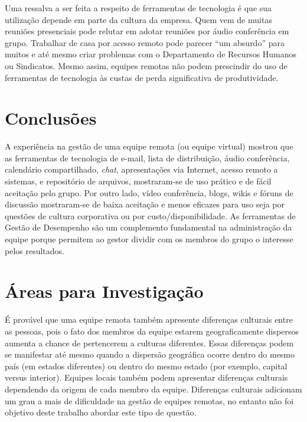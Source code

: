 \documentclass[12pt]{article} %
\begin{document}
Uma ressalva a ser feita a respeito de ferramentas de tecnologia é que sua utilização
depende em parte da cultura da empresa. Quem vem de muitas reuniões 
presenciais pode relutar em adotar reuniões por áudio conferência em grupo.  Trabalhar de casa por acesso remoto pode parecer ``um absurdo'' para muitos e até
mesmo criar problemas com o Departamento de Recursos Humanos ou Sindicatos. 
Mesmo assim, equipes remotas não podem prescindir do uso de ferramentas de tecnologia às custas de 
perda significativa de produtividade.


\section{\fontsize{12}{12}\textbf{Conclusões}}

A experiência na gestão de uma equipe remota (ou equipe virtual) mostrou que as ferramentas de tecnologia de
e-mail, lista de distribuição, áudio conferência, calendário compartilhado, \textit{chat}, apresentações via Internet, acesso remoto
a sistemas, e repositório de arquivos, mostraram-se de uso prático e de fácil aceitação pelo grupo.
Por outro lado, vídeo conferência, blogs, wikis e fóruns de discussão mostraram-se de baixa aceitação e menos
eficazes para uso seja por questões de cultura corporativa ou por custo/disponibilidade.
As ferramentas de Gestão de Desempenho são um complemento fundamental na administração da equipe porque
permitem ao gestor dividir com os membros do grupo o interesse pelos resultados.


\section{\fontsize{12}{12}\textbf{Áreas para Investigação}}

É provável que uma equipe remota também apresente diferenças culturais entre as pessoas, pois o fato dos membros
da equipe estarem geograficamente dispersos aumenta a chance de pertencerem a culturas diferentes.
Essas diferenças podem se manifestar até mesmo quando a dispersão geográfica ocorre dentro do mesmo país (em
estados diferentes) ou dentro do mesmo estado (por exemplo, capital versus interior).
Equipes locais também podem apresentar diferenças culturais dependendo da origem de cada membro da equipe.
Diferenças culturais adicionam um grau a mais de dificuldade na gestão de equipes remotas, no entanto
não foi objetivo deste trabalho abordar este tipo de questão.

\end{document}
